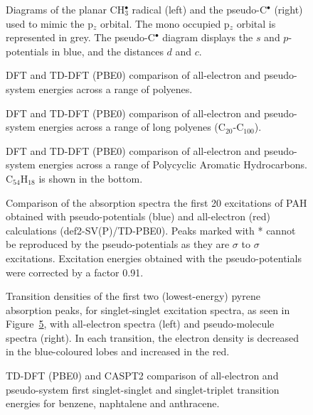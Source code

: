 \documentclass[12pt]{article}
\begin{document}
\begin{figure}
\caption{Diagrams of the planar CH\(^{\bullet}_{3}\) radical (left) and the pseudo-C\(^{\bullet}\) (right)
used to mimic the p$_z$ orbital.
The mono occupied p$_z$ orbital is represented in grey.
The pseudo-C\(^{\bullet}\) diagram displays the \(s\) and \(p\)-potentials in blue,
and the distances \(d\) and \(c\).}
\label{figure:ref_pseudo_diagram}
\end{figure}

\begin{figure}
\caption{DFT and TD-DFT (PBE0) comparison of all-electron and pseudo-system energies across a range of
polyenes.}
\label{fig:alkenes_hf_dft}
\end{figure}

\begin{figure}
\caption{DFT and TD-DFT (PBE0) comparison of all-electron and pseudo-system energies across a range of long polyenes (C\(_{20}\)-C\(_{100}\)).}
\label{fig:long_chain_graphs}
\end{figure}

\begin{figure}
\caption{DFT and TD-DFT (PBE0) comparison of all-electron and pseudo-system energies across a range of Polycyclic Aromatic Hydrocarbons. 
C\(_{54}\)H\(_{18}\) is shown in the bottom.}
\label{fig:rings_graphs}
\end{figure}

\begin{figure}
\caption{Comparison of the absorption spectra the first 20 excitations of PAH obtained with
pseudo-potentials (blue) and all-electron (red) calculations (def2-SV(P)/TD-PBE0). Peaks marked
with * cannot be reproduced by the pseudo-potentials as they are $\sigma$ to $\sigma$ excitations.
Excitation energies obtained with the pseudo-potentials were corrected by a factor 0.91.}
\label{fig:cnhn_uv}
\end{figure}

\begin{figure}
\caption{Transition densities of the first two (lowest-energy) pyrene absorption peaks, for singlet-singlet excitation spectra, as seen in Figure~\ref{fig:cnhn_uv}, with all-electron spectra (left) and pseudo-molecule spectra (right). In each transition, the electron density is decreased in the blue-coloured lobes and increased in the red.}
\label{fig:transitiondensities}
\end{figure}

\begin{figure}
\caption{TD-DFT (PBE0) and CASPT2 comparison of all-electron and pseudo-system first singlet-singlet and
singlet-triplet transition energies for benzene, naphtalene and anthracene.}
\label{fig:caspt2}
\end{figure}
\end{document}
